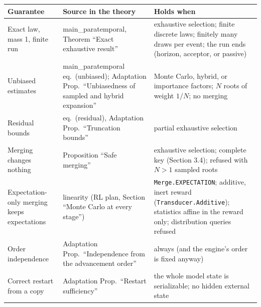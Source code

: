 \documentclass[11pt]{article}
\newcommand{\code}[1]{\texttt{#1}}
\begin{document}
\begin{center}
\small
\begin{tabularx}{\linewidth}{@{}p{3.6cm} p{4.0cm} Y@{}}
\toprule
\textbf{Guarantee} & \textbf{Source in the theory} & \textbf{Holds when}\\
\midrule
Exact law, mass 1, finite run & main\_paratemporal, Theorem ``Exact exhaustive result'' &
  exhaustive selection; finite discrete laws; finitely many draws per event; the run ends (horizon, acceptor, or passive)\\
Unbiased estimates & main\_paratemporal eq.\ (unbiased); Adaptation Prop.\ ``Unbiasedness of sampled and hybrid expansion'' & Monte Carlo, hybrid, or importance factors; $N$ roots of weight $1/N$; no merging\\
Residual bounds & eq.\ (residual), Adaptation Prop.\ ``Truncation bounds'' & partial exhaustive selection\\
Merging changes nothing & Proposition ``Safe merging'' & exhaustive selection; complete key (Section 3.4); refused with $N>1$ sampled roots\\
Expectation-only merging keeps expectations & linearity (RL plan, Section ``Monte Carlo at every stage'') & \code{Merge.EXPECTATION}; additive, inert reward (\code{Transducer.Additive}); statistics affine in the reward only; distribution queries refused\\
Order independence & Adaptation Prop.\ ``Independence from the advancement order'' & always (and the engine's order is fixed anyway)\\
Correct restart from a copy & Adaptation Prop.\ ``Restart sufficiency'' & the whole model state is serializable; no hidden external state\\
\bottomrule
\end{tabularx}
\end{center}
\end{document}
